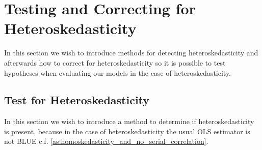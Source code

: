     


\section{Testing and Correcting for Heteroskedasticity}
In this section we wish to introduce methods for detecting heteroskedasticity and afterwards how to correct for heteroskedasticity so it is possible to test hypotheses when evaluating our models in the case of heteroskedasticity.

\subsection{Test for Heteroskedasticity}
In this section we wish to introduce a method to determine if heteroskedasticity is present, because in the case of heteroskedasticity the usual OLS estimator is not BLUE c.f.$\!$ \ref{as:homoskedasticity_and_no_serial_correlation}. 

